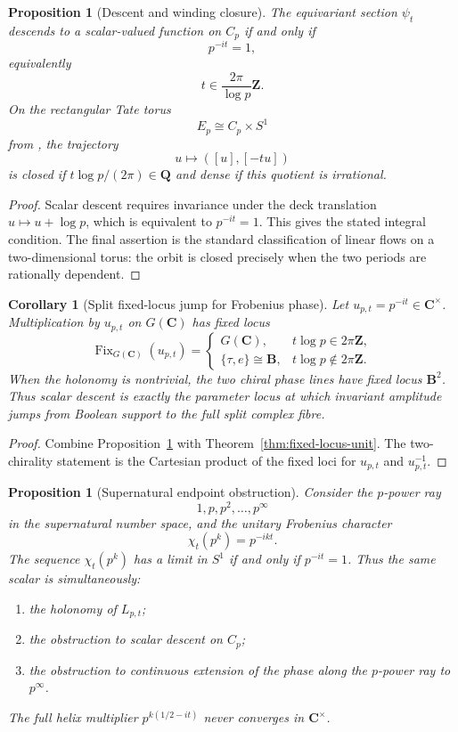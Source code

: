 \documentclass[11pt]{amsart}
\numberwithin{equation}{section}
\newtheorem{proposition}[theorem]{Proposition}
\newtheorem{corollary}[theorem]{Corollary}
\theoremstyle{definition}
\newcommand{\B}{\mathbf B}
\newcommand{\Z}{\mathbf Z}
\newcommand{\Q}{\mathbf Q}
\newcommand{\C}{\mathbf C}
\begin{document}
\begin{proposition}[Descent and winding closure]
\label{prop:helix-descent}
The equivariant section $\psi_t$ descends to a scalar-valued function on
$C_p$ if and only if
\[
p^{-it}=1,
\]
equivalently
\[
t\in\frac{2\pi}{\log p}\Z.
\]
On the rectangular Tate torus
\[
E_p\cong C_p\times S^1
\]
from \cite{CCAbsolute}, the trajectory
\[
u\longmapsto([u],[-tu])
\]
is closed if $t\log p/(2\pi)\in\Q$ and dense if this quotient is
irrational.
\end{proposition}

\begin{proof}
Scalar descent requires invariance under the deck translation
$u\mapsto u+\log p$, which is equivalent to $p^{-it}=1$.  This gives the
stated integral condition.  The final assertion is the standard
classification of linear flows on a two-dimensional torus: the orbit is
closed precisely when the two periods are rationally dependent.
\end{proof}

\begin{corollary}[Split fixed-locus jump for Frobenius phase]
\label{cor:helix-fixed-locus-jump}
Let $u_{p,t}=p^{-it}\in\C^\times$.  Multiplication by $u_{p,t}$ on
$G(\C)$ has fixed locus
\[
\operatorname{Fix}_{G(\C)}(u_{p,t})=
\begin{cases}
G(\C),&t\log p\in2\pi\Z,\\
\{\tau,e\}\cong\B,&t\log p\notin2\pi\Z.
\end{cases}
\]
When the holonomy is nontrivial, the two chiral phase lines have fixed locus $\B^2$.
Thus scalar descent is exactly the parameter locus at which invariant
amplitude jumps from Boolean support to the full split complex fibre.
\end{corollary}

\begin{proof}
Combine Proposition~\ref{prop:helix-descent} with
Theorem~\ref{thm:fixed-locus-unit}.  The two-chirality statement is the
Cartesian product of the fixed loci for $u_{p,t}$ and $u_{p,t}^{-1}$.
\end{proof}

\begin{proposition}[Supernatural endpoint obstruction]
\label{prop:supernatural-holonomy-obstruction}
Consider the $p$-power ray
\[
1,p,p^2,\dots,p^\infty
\]
in the supernatural number space, and the unitary Frobenius character
\[
\chi_t(p^k)=p^{-ikt}.
\]
The sequence $\chi_t(p^k)$ has a limit in $S^1$ if and only if
$p^{-it}=1$.  Thus the same scalar is simultaneously:
\begin{enumerate}[label=\textup{(\roman*)}]
\item the holonomy of $L_{p,t}$;
\item the obstruction to scalar descent on $C_p$;
\item the obstruction to continuous extension of the phase along the
$p$-power ray to $p^\infty$.
\end{enumerate}
The full helix multiplier $p^{k(1/2-it)}$ never converges in $\C^\times$.
\end{proposition}
\end{document}
